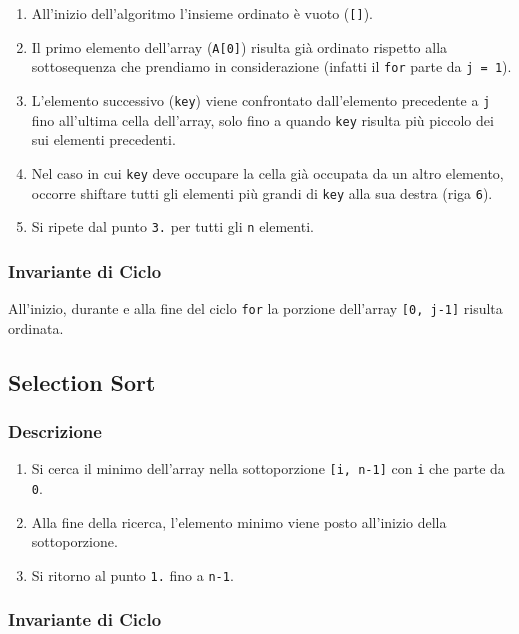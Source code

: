 \documentclass{article}
\begin{document}
\begin{enumerate}
    \item All'inizio dell'algoritmo l'insieme ordinato è vuoto (\verb|[]|).
    \item Il primo elemento dell'array (\verb|A[0]|) risulta già ordinato rispetto alla sottosequenza che prendiamo in considerazione (infatti il \verb|for| parte da \verb|j = 1|).
    \item L'elemento successivo (\verb|key|) viene confrontato dall'elemento precedente a \verb|j| fino all'ultima cella dell'array, solo fino a quando \verb|key| risulta più piccolo dei sui elementi precedenti.
    \item Nel caso in cui \verb|key| deve occupare la cella già occupata da un altro elemento, occorre shiftare tutti gli elementi più grandi di \verb|key| alla sua destra (riga \verb|6|).
    \item Si ripete dal punto \verb|3.| per tutti gli \verb|n| elementi.
\end{enumerate}

\subsubsection{Invariante di Ciclo}

All'inizio, durante e alla fine del ciclo \verb|for| la porzione dell'array \verb|[0, j-1]| risulta ordinata.



\subsection{Selection Sort}

\subsubsection{Descrizione}

\begin{enumerate}
    \item Si cerca il minimo dell'array nella sottoporzione \verb|[i, n-1]| con \verb|i| che parte da \verb|0|.
    \item Alla fine della ricerca, l'elemento minimo viene posto all'inizio della sottoporzione.
    \item Si ritorno al punto \verb|1.| fino a \verb|n-1|.
\end{enumerate}

\subsubsection{Invariante di Ciclo}
\end{document}

